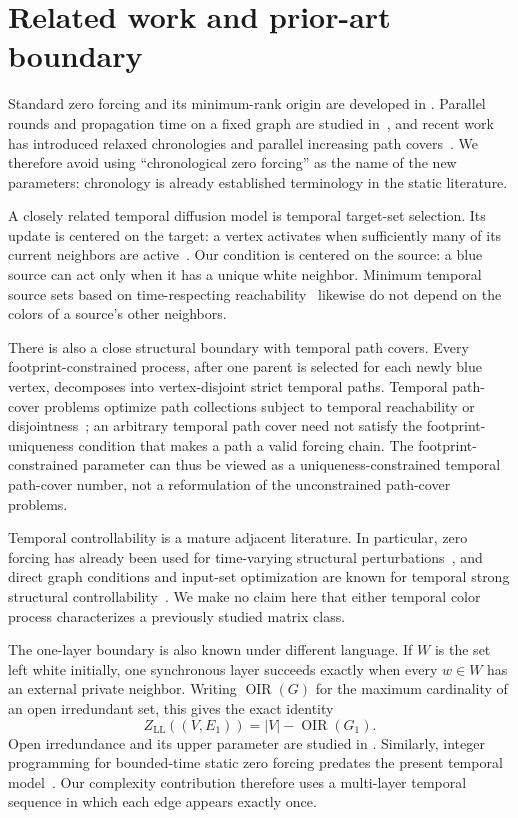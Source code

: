\documentclass[11pt]{article}
\theoremstyle{definition}
\theoremstyle{remark}
\newcommand{\LL}{\mathrm{LL}}
\begin{document}
\section{Related work and prior-art boundary}

Standard zero forcing and its minimum-rank origin are developed in
\cite{aim2008}.  Parallel rounds and propagation time on a fixed graph are
studied in~\cite{hogben2012}, and recent work has introduced relaxed
chronologies and parallel increasing path covers~\cite{hogben2025}.  We
therefore avoid using ``chronological zero forcing'' as the name of the new
parameters: chronology is already established terminology in the static
literature.

A closely related temporal diffusion model is temporal target-set selection.  Its
update is centered on the target: a vertex activates when sufficiently many
of its current neighbors are active~\cite{schierreich2023}.  Our condition is
centered on the source: a blue source can act only when it has a unique white
neighbor.  Minimum temporal source sets based on time-respecting
reachability~\cite{yadav2026} likewise do not depend on the colors of a
source's other neighbors.

There is also a close structural boundary with temporal path covers.  Every
footprint-constrained process, after one parent is selected for each newly
blue vertex, decomposes into vertex-disjoint strict temporal paths.  Temporal
path-cover problems optimize path collections subject to temporal
reachability or disjointness~\cite{chakraborty2024,cioni2026}; an arbitrary
temporal path cover need not satisfy the footprint-uniqueness condition that
makes a path a valid forcing chain.  The footprint-constrained parameter can
thus be viewed as a uniqueness-constrained temporal path-cover number, not a reformulation of the
unconstrained path-cover problems.

Temporal controllability is a mature adjacent literature.  In particular,
zero forcing has already been used for time-varying structural
perturbations~\cite{mousavi2021}, and direct graph conditions and input-set
optimization are known for temporal strong structural
controllability~\cite{srighakollapu2022}.  We make no claim here that either
temporal color process characterizes a previously studied matrix class.

The one-layer boundary is also known under different language.  If $W$ is
the set left white initially, one synchronous layer succeeds exactly when
every $w\in W$ has an external private neighbor.  Writing
$\operatorname{OIR}(G)$ for the maximum cardinality of an open irredundant
set, this gives the exact identity
\[
 Z_{\LL}((V,E_1))=|V|-\operatorname{OIR}(G_1).
\]
Open irredundance and its upper parameter are studied in
\cite{fellows1994}.  Similarly, integer programming for bounded-time static
zero forcing predates the present temporal model~\cite{brimkov2019}.  Our
complexity contribution therefore uses a multi-layer temporal sequence in
which each edge appears exactly once.
\end{document}
